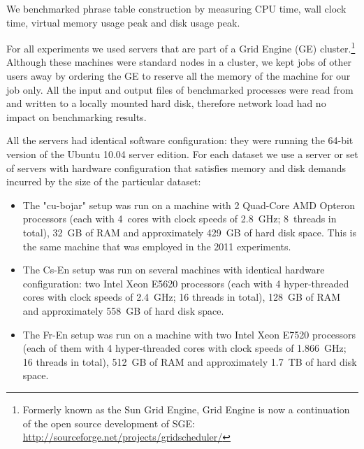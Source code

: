 We benchmarked phrase table construction by measuring CPU time, wall clock time,
virtual memory usage peak and disk usage peak.

For all experiments we used servers that are part of a Grid Engine (GE) cluster.\footnote{Formerly
known as the Sun Grid Engine, Grid Engine is now a continuation of the open source development of SGE:
\url{http://sourceforge.net/projects/gridscheduler/}}
Although these machines were standard nodes in a cluster, we kept jobs of other
users away by ordering the GE to reserve all the memory of the machine for our job only.
All the input and output files of benchmarked processes were read from and written
to a locally mounted hard disk, therefore network load had no impact on
benchmarking results.

All the servers had identical software configuration:
they were running the 64-bit version of the Ubuntu 10.04 server edition.
For each dataset we use a server or set of servers with hardware configuration
that satisfies memory and disk demands incurred by the size of the particular dataset:
\begin{itemize}
  \item The "cu-bojar" setup was run on a machine with 2 Quad-Core
  AMD Opteron\texttrademark{} processors
  (each with 4~cores with clock speeds of 2.8~GHz; 8~threads in total),
  32~GB of RAM and approximately 429~GB of hard disk space. %
  This is the same machine that was employed in the 2011 experiments.
  \item The Cs-En setup was run on several machines with identical hardware
  configuration: two Intel\textregistered{} Xeon\textregistered{} E5620
  processors
  (each with 4 hyper-threaded cores with clock speeds of 2.4~GHz; 16 threads in total),
  128~GB of RAM and approximately 558~GB of hard disk space. %
  \item The Fr-En setup was run on a machine with two Intel\textregistered{}
  Xeon\textregistered{} E7520
  processors
  (each of them with 4 hyper-threaded cores with clock speeds of 1.866~GHz; 16 threads in total),
  512~GB of RAM and approximately 1.7~TB of hard disk space. %
\end{itemize}

